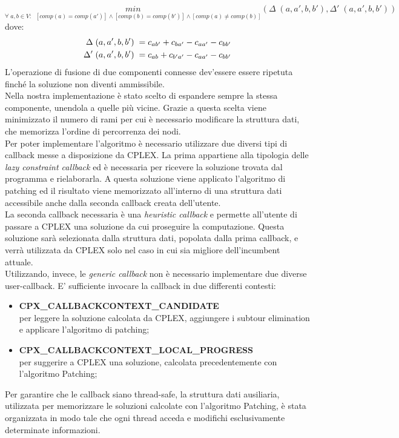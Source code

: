 $$\underset{\forall \; a,b \in V :\;\;[comp(a)=comp(a')] \wedge [comp(b)=comp(b')] \wedge [comp(a)\neq comp(b)]}{min}(\Delta \;(a, a',b, b'), \Delta' \;(a, a', b, b'))$$ dove:
\begin{align}
\Delta \;(a, a',b, b')\;=c_{ab'} + c_{ba'} - c_{aa'} - c_{bb'}\notag\\ 
\Delta' \;(a, a',b, b')\;=c_{ab} + c_{b'a'} - c_{aa'} - c_{bb'}\notag
\end{align}
L'operazione di fusione di due componenti connesse dev'essere essere ripetuta finché la soluzione non diventi ammissibile.\\
Nella nostra implementazione è stato scelto di espandere sempre la stessa componente, unendola a quelle più vicine. Grazie a questa scelta viene minimizzato il numero di rami per cui è necessario modificare la struttura dati, che memorizza l'ordine di percorrenza dei nodi.\\
Per poter implementare l'algoritmo è necessario utilizzare due diversi tipi di callback messe a disposizione da CPLEX. La prima appartiene alla tipologia delle \textit{lazy constraint callback} ed è necessaria per ricevere la soluzione trovata dal programma e rielaborarla. A questa soluzione viene applicato l'algoritmo di patching ed il risultato viene memorizzato all'interno di una struttura dati accessibile anche dalla seconda callback creata dell'utente.\\
La seconda callback necessaria è una \textit{heuristic callback} e permette all'utente di passare a CPLEX una soluzione da cui proseguire la computazione. Questa soluzione sarà selezionata dalla struttura dati, popolata dalla prima callback, e verrà utilizzata da CPLEX solo nel caso in cui sia migliore dell'incumbent attuale.\\
Utilizzando, invece, le \textit{generic callback} non è necessario implementare due diverse user-callback. E' sufficiente invocare la callback in due differenti contesti:
\begin{itemize}
\item{\textbf{CPX\_CALLBACKCONTEXT\_CANDIDATE}\\
per leggere la soluzione calcolata da CPLEX, aggiungere i subtour elimination e applicare l'algoritmo di patching;
}
\item{\textbf{CPX\_CALLBACKCONTEXT\_LOCAL\_PROGRESS}\\
per suggerire a CPLEX una soluzione, calcolata precedentemente con l'algoritmo Patching;
}
\end{itemize}
Per garantire che le callback siano thread-safe, la struttura dati ausiliaria, utilizzata per memorizzare le soluzioni calcolate con l'algoritmo Patching, è stata organizzata in modo tale che ogni thread acceda e modifichi esclusivamente determinate informazioni.\\


